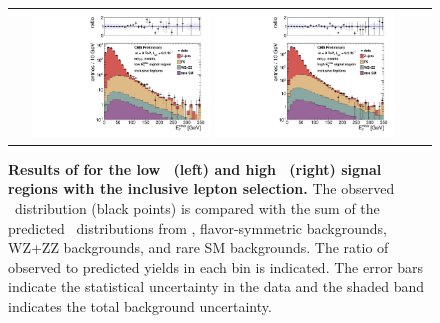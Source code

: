 \begin{figure}[!h]
\begin{center}
\begin{tabular}{cc}
\includegraphics[width=0.45\textwidth]{plots/edge_pfmet_pt40_lowMet_all.pdf}
\includegraphics[width=0.45\textwidth]{plots/edge_pfmet_pt40_highMet_all.pdf}
\end{tabular}
\caption{\footnotesize {\bf Results of for the low \MET\ (left) and high \MET\ (right) signal regions with the inclusive lepton selection.}
The observed \MET\ distribution (black points) is compared with the sum of the predicted \MET\
distributions from \zjets, flavor-symmetric backgrounds, WZ+ZZ backgrounds, and rare SM backgrounds. 
The ratio of observed to predicted yields in each bin is
indicated. The error bars indicate the statistical uncertainty in the data and the shaded band indicates the total background uncertainty.
\label{fig:results_fulledge}
}
\end{center}
\end{figure}

